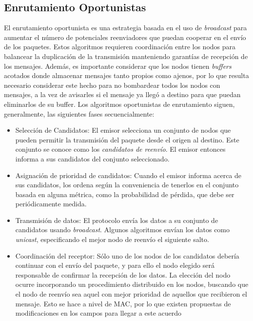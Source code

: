 \documentclass[10pt,preprint,onecolumn]{paper}
\begin{document}
\subsection{Enrutamiento Oportunistas}
\label{sec:op}
El enrutamiento oportunista es una estrategia basada en el uso de \emph{broadcast} para aumentar el número de potenciales reenviadores que puedan cooperar en el envío de los paquetes. Estos algoritmos requieren coordinación entre los nodos para balancear la duplicación de la transmisión manteniendo garantías de recepción de los mensajes. Además, es importante considerar que los nodos tienen \emph{buffers} acotados donde almacenar mensajes tanto propios como ajenos, por lo que resulta necesario considerar este hecho para no bombardear todos los nodos con mensajes, a la vez de avisarles si el mensaje ya llegó a destino para que puedan eliminarlos de su buffer.
Los algoritmos oportunistas de enrutamiento siguen, generalmente, las siguientes fases secuencialmente:
\begin{itemize}
\item Selección de Candidatos: El emisor selecciona un conjunto de nodos que pueden permitir la transmisión del paquete desde el origen al destino. Este conjunto se conoce como los \emph{candidatos de reenvío}. El emisor entonces informa a sus candidatos del conjunto seleccionado.

\item Asignación de prioridad de candidatos: Cuando el emisor informa acerca de sus candidatos, los ordena según la conveniencia de tenerlos en el conjunto basada en alguna métrica, como la probabilidad de pérdida, que debe ser periódicamente medida. 

\item Transmisión de datos: El protocolo envía los datos a su conjunto de candidatos usando \emph{broadcast}. Algunos algoritmos envían los datos como \emph{unicast}, especificando el mejor nodo de reenvío el siguiente salto. 

\item Coordinación del receptor: Sólo uno de los nodos de los candidatos debería continuar con el envío del paquete, y para ello el nodo elegido será responsable de confirmar la recepción de los datos. La elección del nodo ocurre incorporando un procedimiento distribuido en los nodos, buscando que el nodo de reenvío sea aquel con mejor prioridad de aquellos que recibieron el mensaje. Esto se hace a nivel de MAC, por lo que existen propuestas de modificaciones en los campos para llegar a este acuerdo \cite{mac}
\end{itemize}
\end{document}
